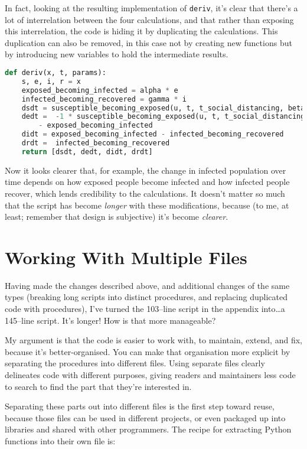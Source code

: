 \documentclass[a4paper]{article}
\begin{document}
In fact, looking at the resulting implementation of \texttt{deriv}, it's clear that there's a lot of interrelation between the four calculations, and that rather than exposing this interrelation, the code is hiding it by duplicating the calculations.
This duplication can also be removed, in this case not by creating new functions but by introducing new variables to hold the intermediate results.

\begin{lstlisting}[language=Python]
def deriv(x, t, params):
    s, e, i, r = x
    exposed_becoming_infected = alpha * e
    infected_becoming_recovered = gamma * i
    dsdt = susceptible_becoming_exposed(u, t, t_social_distancing, beta, s, i)
    dedt =  -1 * susceptible_becoming_exposed(u, t, t_social_distancing, beta, s, i)\
        - exposed_becoming_infected
    didt = exposed_becoming_infected - infected_becoming_recovered
    drdt =  infected_becoming_recovered
    return [dsdt, dedt, didt, drdt]
\end{lstlisting}

Now it looks clearer that, for example, the change in infected population over time depends on how exposed people become infected and how infected people recover, which lends credibility to the calculations.
It doesn't matter so much that the script has become \emph{longer} with these modifications, because (to me, at least; remember that design is subjective) it's become \emph{clearer}.

\section{Working With Multiple Files}
Having made the changes described above, and additional changes of the same types (breaking long scripts into distinct procedures, and replacing duplicated code with procedures), I've turned the 103--line script in the appendix into\ldots a 145--line script.
It's longer! How is that more manageable?

My argument is that the code is easier to work with, to maintain, extend, and fix, because it's better-organised.
You can make that organisation more explicit by separating the procedures into different files.
Using separate files clearly delineates code with different purposes, giving readers and maintainers less code to search to find the part that they're interested in.

Separating these parts out into different files is the first step toward reuse, because those files can be used in different projects, or even packaged up into libraries and shared with other programmers.
The recipe for extracting Python functions into their own file is:
\end{document}
